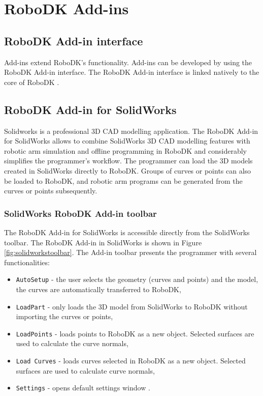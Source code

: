 \section{RoboDK Add-ins}

\subsection{RoboDK Add-in interface}

Add-ins extend RoboDK's functionality. Add-ins can be developed by using the RoboDK Add-in interface. The RoboDK Add-in interface is linked natively to the core of RoboDK \cite{robodkaddininterface}.

\subsection{RoboDK Add-in for SolidWorks}

Solidworks is a professional 3D CAD modelling application. The RoboDK Add-in for SolidWorks allows to combine SolidWorks 3D CAD modelling features with robotic arm simulation and offline programming in RoboDK and considerably simplifies the programmer's workflow. The programmer can load the 3D models created in SolidWorks directly to RoboDK. Groups of curves or points can also be loaded to RoboDK, and robotic arm programs can be generated from the curves or points subsequently.

\subsubsection*{SolidWorks RoboDK Add-in toolbar}

The RoboDK Add-in for SolidWorks is accessible directly from the SolidWorks toolbar.  The RoboDK Add-in in SolidWorks is shown in Figure  \ref{fig:solidworkstoolbar}. The Add-in toolbar presents the programmer with several functionalities:

\begin{itemize}
    \item \texttt{AutoSetup} - the user selects the geometry (curves and points) and the model, the curves are automatically transferred to RoboDK,
    \item \texttt{LoadPart} - only loads the 3D model from SolidWorks to RoboDK without importing the curves or points,
    \item \texttt{LoadPoints} - loads points to RoboDK as a new object. Selected surfaces are used to calculate the curve normals, 
    \item \texttt{Load Curves} -  loads curves selected in RoboDK as a new object. Selected surfaces are used to calculate curve normals, 
    \item \texttt{Settings} - opens default settings window \cite{robodksolidworks}.
\end{itemize}

